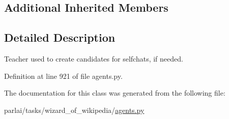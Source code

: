 \subsection*{Additional Inherited Members}


\subsection{Detailed Description}
\begin{DoxyVerb}Teacher used to create candidates for selfchats, if needed.
\end{DoxyVerb}
 

Definition at line 921 of file agents.\+py.



The documentation for this class was generated from the following file\+:\begin{DoxyCompactItemize}
\item 
parlai/tasks/wizard\+\_\+of\+\_\+wikipedia/\hyperlink{parlai_2tasks_2wizard__of__wikipedia_2agents_8py}{agents.\+py}\end{DoxyCompactItemize}
